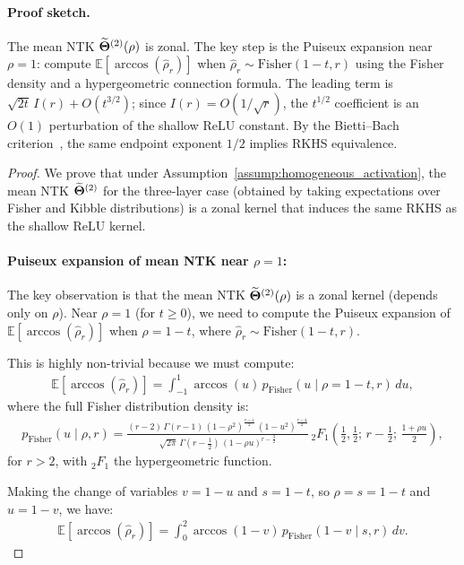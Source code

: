 \paragraph{Proof sketch.} The mean NTK \(\widetilde{\boldsymbol{\Theta}}^{(2)}(\rho)\) is zonal. The key step is the Puiseux expansion near \(\rho=1\): compute \(\mathbb{E}[\arccos(\hat{\rho}_r)]\) when \(\hat{\rho}_r\sim\mathrm{Fisher}(1-t,r)\) using the Fisher density and a hypergeometric connection formula. The leading term is \(\sqrt{2t}\,I(r)+O(t^{3/2})\); since \(I(r)=O(1/\sqrt{r})\), the \(t^{1/2}\) coefficient is an \(O(1)\) perturbation of the shallow ReLU constant. By the Bietti--Bach criterion~\cite[Theorem~1]{bietti2021deepequalsshallowrelu}, the same endpoint exponent \(1/2\) implies RKHS equivalence.
\begin{proof}
We prove that under Assumption~\ref{assump:homogeneous_activation}, the mean NTK \( \widetilde{\boldsymbol{\Theta}}^{(2)} \) for the three-layer case (obtained by taking expectations over Fisher and Kibble distributions) is a zonal kernel that induces the same RKHS as the shallow ReLU kernel.

\paragraph{Puiseux expansion of mean NTK near \( \rho = 1 \):}
The key observation is that the mean NTK \( \widetilde{\boldsymbol{\Theta}}^{(2)}(\rho) \) is a zonal kernel (depends only on \( \rho \)). Near \( \rho = 1 \) (for \( t \ge 0 \)), we need to compute the Puiseux expansion of \( \mathbb{E}[\arccos(\hat{\rho}_r)] \) when \( \rho = 1-t \), where \( \hat{\rho}_r \sim \text{Fisher}(1-t, r) \).

This is highly non-trivial because we must compute:
\begin{align}
\mathbb{E}[\arccos(\hat{\rho}_r)] = \int_{-1}^{1} \arccos(u) \, p_{\text{Fisher}}(u \mid \rho=1-t, r) \, du,
\end{align}
where the full Fisher distribution density is:
\begin{align}
p_{\text{Fisher}}(u \mid \rho, r) = \frac{(r-2)\,\Gamma(r-1)\,(1-\rho^2)^{\frac{r-1}{2}}\,(1-u^2)^{\frac{r-4}{2}}}{\sqrt{2\pi}\,\Gamma(r-\tfrac{1}{2})\,(1-\rho u)^{r-\frac{3}{2}}}\,{}_2F_1\!\left(\tfrac{1}{2},\tfrac{1}{2};\, r-\tfrac{1}{2};\, \tfrac{1+\rho u}{2}\right),
\end{align}
for \( r > 2 \), with \( {}_2F_1 \) the hypergeometric function.

Making the change of variables \( v = 1-u \) and \( s = 1-t \), so \( \rho = s = 1-t \) and \( u = 1-v \), we have:
\begin{align}
\mathbb{E}[\arccos(\hat{\rho}_r)] = \int_{0}^{2} \arccos(1-v) \, p_{\text{Fisher}}(1-v \mid s, r) \, dv.
\end{align}


\end{proof}
